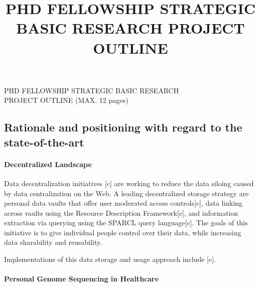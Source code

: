\documentclass[a4paper,11pt]{article}
\begin{document}
\begin{mdframed}[backgroundcolor=black!17,linecolor=black!0,font=\bfseries]
	\centering
	PHD FELLOWSHIP STRATEGIC BASIC RESEARCH\\
	PROJECT OUTLINE (MAX. 12 pages)\\
	\end{mdframed}
	\vspace{-.5\baselineskip}
\title{PHD FELLOWSHIP STRATEGIC BASIC RESEARCH PROJECT OUTLINE}

\begin{refsection}

\section{Rationale and positioning with regard to the state-of-the-art}

\smallskip

\paragraph{Decentralized Landscape}
Data decentralization initiatives [c] are working to reduce the data siloing caused by data centralization on the Web.
A leading decentralized storage strategy are personal data vaults that offer user moderated access controls[c], data linking across vaults using the Resource Description Framework[c], and information extraction via querying using the SPARCL query language[c].
The goals of this initiative is to give individual people control over their data, while increasing data sharability and reusability.

Implementations of this data storage and usage approach include [c].


\paragraph{Personal Genome Sequencing in Healthcare}


\end{refsection}
\end{document}
